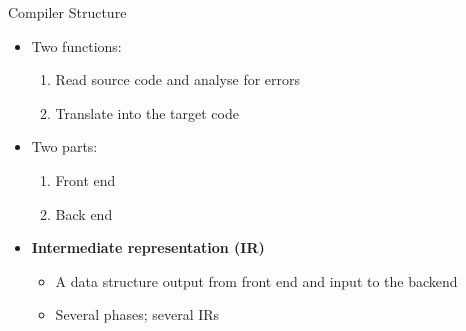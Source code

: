 \documentclass{beamer}
\begin{document}
\begin{frame}{Compiler Structure}

\begin{center}

\end{center}
\begin{itemize}
\item Two functions:
	\begin{enumerate}
	\item Read source code and analyse for errors
	\item Translate into the target code
	\end{enumerate}
\item Two parts:
	\begin{enumerate}
	\item Front end
	\item Back end
	\end{enumerate}
\pause
\item \textbf{Intermediate representation (IR)}
	\begin{itemize}
	\item  A data structure output from front end and input to the backend
	\item Several phases; several IRs
	\end{itemize}
\end{itemize}

\end{frame}
\end{document}
